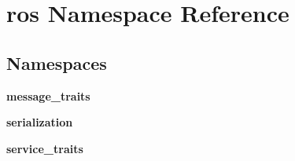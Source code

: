 \section{ros Namespace Reference}
\label{namespaceros}
\subsection*{Namespaces}
\begin{DoxyCompactItemize}
\item 
{\bf message\-\_\-traits}
\item 
{\bf serialization}
\item 
{\bf service\-\_\-traits}
\end{DoxyCompactItemize}
